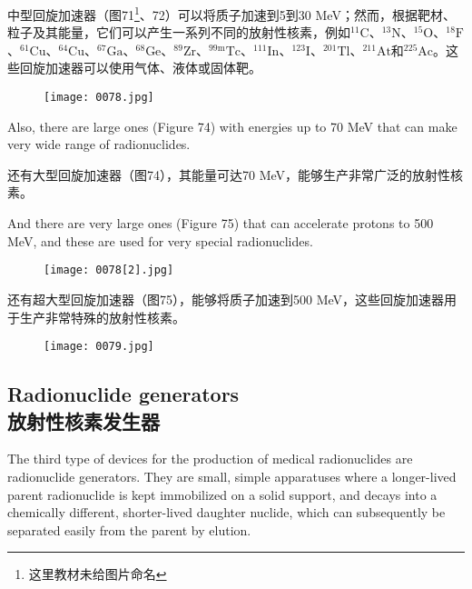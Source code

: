 \documentclass[dvipsnames, svgnames,a4paper,11pt]{article}
\begin{document}
中型回旋加速器（图71\footnote{这里教材未给图片命名}、72）可以将质子加速到5到30 MeV；然而，根据靶材、粒子及其能量，它们可以产生一系列不同的放射性核素，例如$^{11}\text{C}$、$^{13}\text{N}$、$^{15}\text{O}$、$^{18}\text{F}$、$^{61}\text{Cu}$、$^{64}\text{Cu}$、$^{67}\text{Ga}$、$^{68}\text{Ge}$、$^{89}\text{Zr}$、$^{99\text{m}}\text{Tc}$、$^{111}\text{In}$、$^{123}\text{I}$、$^{201}\text{Tl}$、$^{211}\text{At}$和$^{225}\text{Ac}$。这些回旋加速器可以使用气体、液体或固体靶。

\begin{figure}[H]
    \centering
    \texttt{[image: 0078.jpg]}
     \label{fig73}
\end{figure}

Also, there are large ones (Figure 74) with energies up to 70 MeV that can make very wide range of radionuclides.

还有大型回旋加速器（图74），其能量可达70 MeV，能够生产非常广泛的放射性核素。

And there are very large ones (Figure 75) that can accelerate protons to 500 MeV, and these are used for very special radionuclides.

\begin{figure}[H]
    \centering
    \texttt{[image: 0078[2].jpg]}
     \label{fig74}
\end{figure}

还有超大型回旋加速器（图75），能够将质子加速到500 MeV，这些回旋加速器用于生产非常特殊的放射性核素。

\begin{figure}[H]
    \centering
    \texttt{[image: 0079.jpg]}
     \label{fig75}
\end{figure}

\subsection{Radionuclide generators\\放射性核素发生器}

The third type of devices for the production of medical radionuclides are radionuclide generators. They are small, simple apparatuses where a longer-lived parent radionuclide is kept immobilized on a solid support, and decays into a chemically different, shorter-lived daughter nuclide, which can subsequently be separated easily from the parent by elution.
\end{document}
